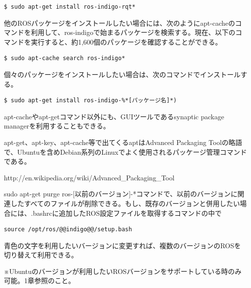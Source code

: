 \begin{lstlisting}[language=ROS]
$ sudo apt-get install ros-indigo-rqt*
\end{lstlisting}

\begin{exercise}[ROSパッケージのバイナリのインストール]
  他のROSパッケージをインストールしたい場合には、次のようにapt-cacheのコマンドを利用して、ros-indigoで始まるパッケージを検索する。現在、以下のコマンドを実行すると、約1,600個のパッケージを確認することができる。

  \begin{lstlisting}[language=ROS]
  $ sudo apt-cache search ros-indigo*
  \end{lstlisting}

  個々のパッケージをインストールしたい場合は、次のコマンドでインストールする。

  \begin{lstlisting}[language=ROS]
  $ sudo apt-get install ros-indigo-%*[パッケージ名]*)
  \end{lstlisting}

  apt-cacheやapt-getコマンド以外にも、GUIツールであるsynaptic package managerを利用することもできる。
\end{exercise}

\begin{exercise}
  apt-get、apt-key、apt-cache等で出てくるaptはAdvanced Packaging Toolの略語で、Ubuntuを含めDebian系列のLinuxでよく使用されるパッケージ管理コマンドである。

  http://en.wikipedia.org/wiki/Advanced\_Packaging\_Tool
\end{exercise}

\begin{exercise}[以前のバージョンのROSの削除と他のROSバージョンの併用]
  sudo apt-get purge ros-[以前のバージョン]-*コマンドで、以前のバージョンに関連したすべてのファイルが削除できる。もし、既存のバージョンと併用したい場合には、.bashrcに追加したROS設定ファイルを取得するコマンドの中で

  \begin{lstlisting}[moredelim={[is][keywordstyle]{@@}{@@}}]
source /opt/ros/@@indigo@@/setup.bash
  \end{lstlisting}

  青色の文字を利用したいバージョンに変更すれば、複数のバージョンのROSを切り替えて利用できる。

 ※Ubuntuのバージョンが利用したいROSバージョンをサポートしている時のみ可能。1章参照のこと。
\end{exercise}

